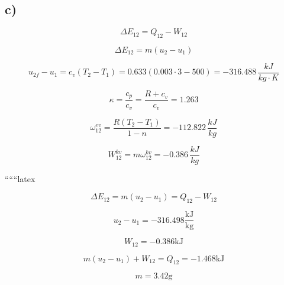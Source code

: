 

\subsection*{c)}
\[
\Delta E_{12} = Q_{12} - W_{12}
\]

\[
\Delta E_{12} = m (u_2 - u_1)
\]

\[
u_{2f} - u_1 = c_v (T_2 - T_1) = 0.633 (0.003 \cdot 3 - 500) = -316.488 \, \frac{kJ}{kg \cdot K}
\]

\[
\kappa = \frac{c_p}{c_v} = \frac{R + c_v}{c_v} = 1.263
\]

\[
\omega_{12}^{ev} = \frac{R (T_2 - T_1)}{1 - n} = -112.822 \, \frac{kJ}{kg}
\]

\[
W_{12}^{kv} = m \omega_{12}^{kv} = -0.386 \, \frac{kJ}{kg}
\]

``````latex


\[
\Delta E_{12} = m(u_2 - u_1) = Q_{12} - W_{12}
\]

\[
u_2 - u_1 = -316.498 \frac{\text{kJ}}{\text{kg}}
\]

\[
W_{12} = -0.386 \text{kJ}
\]

\[
m(u_2 - u_1) + W_{12} = Q_{12} = -1.468 \text{kJ}
\]

\[
m = 3.42 \text{g}
\]